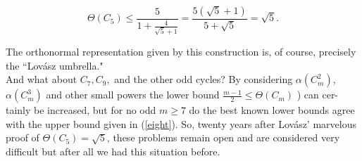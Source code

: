 \[
\Theta(C_5) \leq {\frac{5}{1 + {\frac{4}{\sqrt{5}+1}}}}={\frac{5(\sqrt{5}+1)}{5+\sqrt{5}}} = \sqrt{5}.
\]

The orthonormal representation given by this construction is, of course, 
precisely the ``Lov\'asz umbrella."\\
And what about $C_7, C_9,$ and the other odd cycles? By considering $\alpha(C_m^2)$,
$\alpha(C_m^3)$ and other small powers the lower bound ${\frac{m-1}{2}} \leq \Theta(C_m)$ ) can cer-
tainly be increased, but for no odd $m \geq 7$  do the best known lower bounds
agree with the upper bound given in (\ref{eight}). So, twenty years after Lov\'asz' 
marvelous proof of $\Theta(C_5) = \sqrt{5}$, these problems remain open and are 
considered very difficult \text{---} but after all we had this situation before.\\

